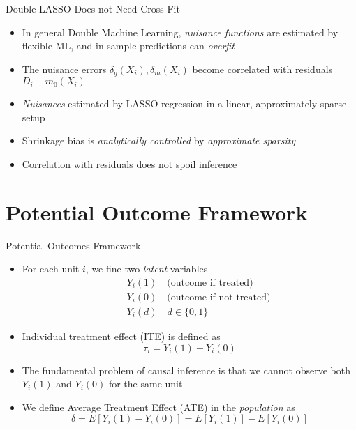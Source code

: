 \documentclass[aspectratio=1610,12pt,xcolor=dvipsnames]{beamer}
\begin{document}
\begin{frame}{Double LASSO Does not Need Cross-Fit}

\begin{itemize}
    \item In general Double Machine Learning, \textit{nuisance functions} are estimated by flexible ML, and in-sample predictions can \textit{overfit}
    \item The nuisance errors $\delta_g(X_i),\delta_m(X_i)$ become correlated with residuals $D_i - m_0(X_i)$ \pause
    \item \textit{Nuisances} estimated by LASSO regression in a linear, approximately sparse setup
    \item Shrinkage bias is \textit{analytically controlled} by \textit{approximate sparsity}
    \item Correlation with residuals does not spoil inference
\end{itemize}
\end{frame}

\section{Potential Outcome Framework}

\begin{frame}
  \sectionpage
\end{frame}

\begin{frame}{Potential Outcomes Framework}
\begin{itemize}
\item For each unit \(i\), we fine two \textit{latent} variables  
  \begin{align*}
  &Y_i(1) \quad \text{(outcome if treated)} \\ \quad &Y_i(0) \quad \text{(outcome if not treated)} \\
  &Y_i(d) \quad d \in \{0,1\}
  \end{align*}
\item Individual treatment effect (ITE) is defined as  
  \[
  \tau_i = Y_i(1) - Y_i(0)
  \]
\item The fundamental problem of causal inference is that we cannot observe both \(Y_i(1)\) and \(Y_i(0)\) for the same unit
\item We define Average Treatment Effect (ATE) in the \textit{population} as 
  \[
  \delta = E[Y_i(1) - Y_i(0)] = E[Y_i(1)] - E[Y_i(0)]
  \]
\end{itemize}
\end{frame}
\end{document}
